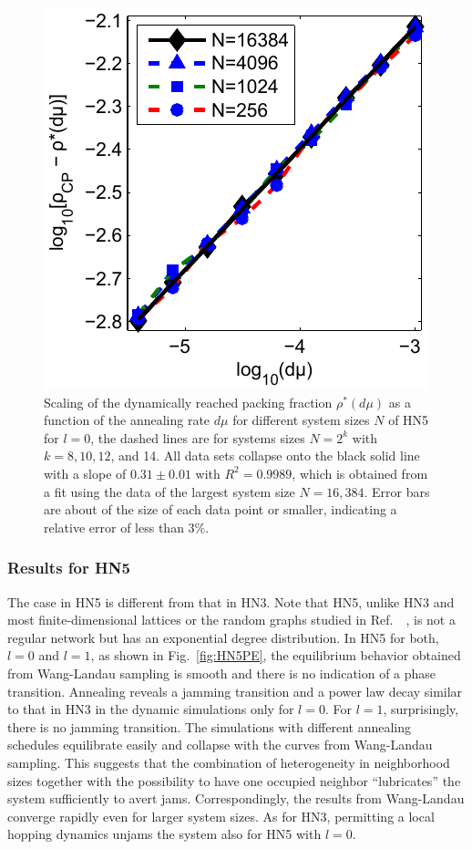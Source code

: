 \begin{figure}
\centering \includegraphics[width=0.5\columnwidth]{Chapter-2/Paper_HN5_Decay_Plot}
\protect\caption{Scaling of the dynamically reached packing fraction $\rho^{*}(d\mu)$
as a function of the annealing rate $d\mu$ for different system sizes
$N$ of HN5 for $l=0$, the dashed lines are for systems sizes $N=2^{k}$
with $k=8,10,12$, and 14. All data sets collapse onto the black solid line
with a slope of $0.31\pm0.01$ with $R^{2}=0.9989$, which is obtained
from a fit using the data of the largest system size $N=16,384$. Error
bars are about of the size of each data point or smaller, indicating
a relative error of less than $3\%$. }


\label{fig:HN5Decay} 
\end{figure}



\subsubsection{Results for HN5}

\label{subsec:HN5}

The case in HN5 is different from that in HN3. Note that HN5, unlike
HN3 and most finite-dimensional lattices or the random graphs studied
in Ref.~~\cite{Krzakala2008}, is not a regular network but has an exponential
degree distribution. In HN5 for both, $l=0$ and $l=1$, as shown
in Fig.~\ref{fig:HN5PE}, the equilibrium behavior obtained from Wang-Landau
sampling is smooth and there is no indication of a phase transition.
Annealing reveals a jamming transition and a power law decay similar
to that in HN3 in the dynamic simulations only for $l=0$. For $l=1$,
surprisingly, there is no jamming transition. The simulations with
different annealing schedules equilibrate easily and collapse with
the curves from Wang-Landau sampling. This suggests that the combination
of heterogeneity in neighborhood sizes together with the possibility
to have one occupied neighbor ``lubricates'' the system sufficiently
to avert jams. Correspondingly, the results from Wang-Landau converge
rapidly even for larger system sizes. As for HN3, permitting a local
hopping dynamics unjams the system also for HN5 with $l=0$.

